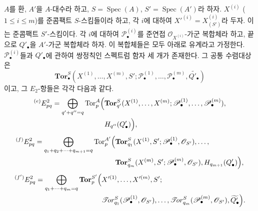 \begin{corollary}[6.9.4]
\label{III.6.9.4-fr}
$A$를 환, $A'$을 $A$-대수라 하고,
$S=\operatorname{Spec}(A)$, $S'=\operatorname{Spec}(A')$라 하자.
$X^{(i)}$ ($1\leq i\leq m$)를 준콤팩트 $S$-스킴들이라 하고, 각
$i$에 대하여
$X'^{(i)}=X_{(S')}^{(i)}$라 두자. 이는 준콤팩트 $S'$-스킴이다.
각 $i$에 대하여 $\mathscr P_\bullet^{(i)}$를 준연접
$\mathscr O_{X^{(i)}}$-가군 복합체라 하고, 끝으로 $Q'_\bullet$을
$A'$-가군 복합체라 하자. 이 복합체들은 모두 아래로 유계라고
가정한다. $\mathscr P_\bullet^{(i)}$들과 $Q'_\bullet$에 관하여
쌍정칙인 스펙트럼 함자 세 개가 존재한다. 그 공통 수렴대상은
\[
  \mathbf{Tor}_\bullet^S
  (X^{(1)},\ldots,X^{(m)},S';
   \mathscr P_\bullet^{(1)},\ldots,\mathscr P_\bullet^{(m)},
   \widetilde{Q'_\bullet})
\]
이고, 그 $E_2$-항들은 각각 다음과 같다.
\[
\begin{split}
  {}^{(e)}E_{pq}^2
  =\bigoplus_{q'+q''=q}
  \operatorname{Tor}_p^A\Bigl(
  &\mathbf{Tor}_{q'}^S
  (X^{(1)},\ldots,X^{(m)};
   \mathscr P_\bullet^{(1)},\ldots,\mathscr P_\bullet^{(m)}),\\
  &H_{q''}(Q'_\bullet)
  \Bigr),
\end{split}
\]
\[
\begin{split}
  {}^{(f)}E_{pq}^2
  =\bigoplus_{q_1+q_2+\cdots+q_{m+1}=q}
  \operatorname{Tor}_p^{A'}\Bigl(
  &\mathbf{Tor}_{q_1}^S
  (X^{(1)},S';\mathscr P_\bullet^{(1)},\mathscr O_{S'}),\ldots,\\
  &\mathbf{Tor}_{q_m}^S
  (X^{(m)},S';\mathscr P_\bullet^{(m)},\mathscr O_{S'}),
  H_{q_{m+1}}(Q'_\bullet)
  \Bigr),
\end{split}
\]
\[
\begin{split}
  {}^{(f')}E_{pq}^2
  =\bigoplus_{q_1+\cdots+q_m=q}
  \mathbf{Tor}_p^{S'}\Bigl(
  &X'^{(1)},\ldots,X'^{(m)},S';\\
  &\mathscr{T}\!or_{q_1}^S
  (\mathscr P_\bullet^{(1)},\mathscr O_{S'}),\ldots,
  \mathscr{T}\!or_{q_m}^S
  (\mathscr P_\bullet^{(m)},\mathscr O_{S'}),
  \widetilde{Q'_\bullet}
  \Bigr).
\end{split}
\]
\end{corollary}

